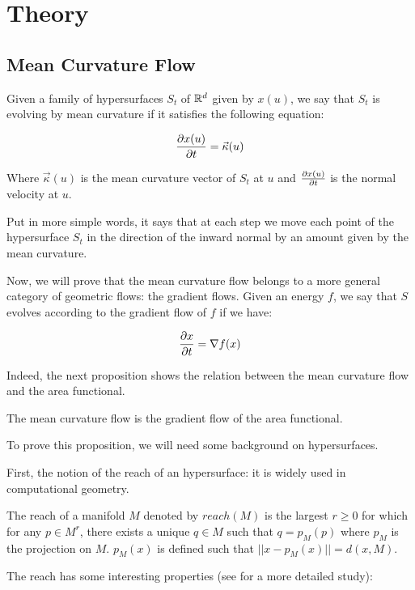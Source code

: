 \chapter{Theory}
\label{chapter:theory}

\section{Mean Curvature Flow}

Given a family of hypersurfaces $ S_t $ of $ \mathbb{R}^d $ given by $ x(u) $, we say
that $ S_t $ is evolving by mean curvature if it satisfies the following
equation:

$$ \frac{\partial{x(u)}}{\partial{t}} = \vec{\kappa}(u) $$

Where $ \vec{\kappa}(u) $ is the mean curvature vector of $ S_t $ at $ u $ and
$ \frac{\partial{x(u)}}{\partial{t}} $ is the normal velocity at $ u $.

Put in more simple words, it says that at each step we move each point of the
hypersurface $ S_t $ in the direction of the inward normal by an amount given by
the mean curvature.

Now, we will prove that the mean curvature flow belongs to a more general
category of geometric flows: the gradient flows. Given an energy $ f $, we say
that $ S $ evolves according to the gradient flow of $ f $ if we have:

$$ \frac{\partial{x}}{\partial{t}} = \nabla f(x) $$

Indeed, the next proposition shows the relation between the mean curvature flow
and the area functional.

\begin{proposition}
    The mean curvature flow is the gradient flow of the area functional.
\end{proposition}

To prove this proposition, we will need some background on hypersurfaces.

First, the notion of the reach of an hypersurface: it is widely used in
computational geometry.
\begin{definition}
    The reach of a manifold $ M $ denoted by $ reach(M) $ is the largest $ r
    \geq 0 $ for which for any $ p \in M^r $, there exists a unique $ q \in M $
    such that $ q = p_M(p) $ where $ p_M $ is the projection on $ M $. $ p_M(x)
    $ is defined such that $ || x - p_M(x) || = d(x, M) $.
\end{definition}

The reach has some interesting properties (see \cite{merigot2009detection} for a
more detailed study):

